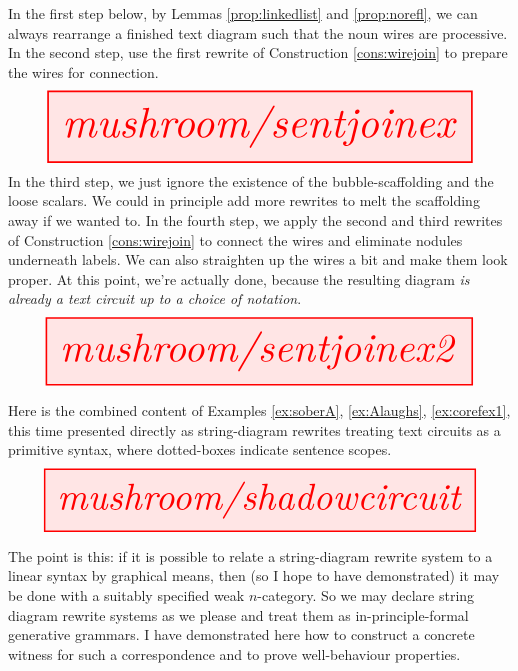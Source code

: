 \vfill

\newpage
\clearpage

\vfill

\begin{myboxR}
\begin{example}
In the first step below, by Lemmas \ref{prop:linkedlist} and \ref{prop:norefl}, we can always rearrange a finished text diagram such that the noun wires are processive. In the second step, use the first rewrite of Construction \ref{cons:wirejoin} to prepare the wires for connection.
\[
\resizebox{\textwidth}{!}{\tikzfig{mushroom/sentjoinex}} 
\]
In the third step, we just ignore the existence of the bubble-scaffolding and the loose scalars. We could in principle add more rewrites to melt the scaffolding away if we wanted to. In the fourth step, we apply the second and third rewrites of Construction \ref{cons:wirejoin} to connect the wires and eliminate nodules underneath labels. We can also straighten up the wires a bit and make them look proper. At this point, we're actually done, because the resulting diagram \emph{is already a text circuit up to a choice of notation}.
\[
\resizebox{\textwidth}{!}{\tikzfig{mushroom/sentjoinex2}} 
\]
\end{example}
\end{myboxR}

\begin{myboxB}
\begin{example}\label{ex:directgrowth}
Here is the combined content of Examples \ref{ex:soberA}, \ref{ex:Alaughs}, \ref{ex:corefex1}, this time presented directly as string-diagram rewrites treating text circuits as a primitive syntax, where dotted-boxes indicate sentence scopes.
\[\resizebox{\textwidth}{!}{\tikzfig{mushroom/shadowcircuit}}\]
\end{example}
The point is this: if it is possible to relate a string-diagram rewrite system to a linear syntax by graphical means, then (so I hope to have demonstrated) it may be done with a suitably specified weak $n$-category. So we may declare string diagram rewrite systems as we please and treat them as in-principle-formal generative grammars. I have demonstrated here how to construct a concrete witness for such a correspondence and to prove well-behaviour properties.
\end{myboxB}

\vfill

\newpage
\clearpage

\newpage

